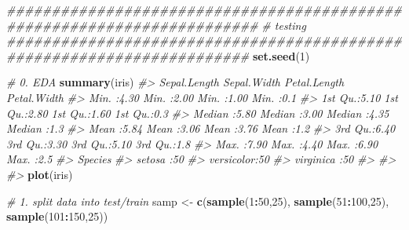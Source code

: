 \documentclass[]{book}
\newenvironment{Shaded}{\begin{snugshade}}{\end{snugshade}}
\newcommand{\CommentTok}[1]{\textcolor[rgb]{0.56,0.35,0.01}{\textit{#1}}}
\newcommand{\DecValTok}[1]{\textcolor[rgb]{0.00,0.00,0.81}{#1}}
\newcommand{\KeywordTok}[1]{\textcolor[rgb]{0.13,0.29,0.53}{\textbf{#1}}}
\newcommand{\NormalTok}[1]{#1}
\newcommand{\OperatorTok}[1]{\textcolor[rgb]{0.81,0.36,0.00}{\textbf{#1}}}
\newcommand{\StringTok}[1]{\textcolor[rgb]{0.31,0.60,0.02}{#1}}
\begin{document}
\begin{Shaded}
\begin{Highlighting}[]

\CommentTok{########################################################################}
\CommentTok{# testing}
\CommentTok{#######################################################################}
\KeywordTok{set.seed}\NormalTok{(}\DecValTok{1}\NormalTok{)}

\CommentTok{# 0. EDA}
\KeywordTok{summary}\NormalTok{(iris)}
\CommentTok{#>   Sepal.Length   Sepal.Width    Petal.Length   Petal.Width }
\CommentTok{#>  Min.   :4.30   Min.   :2.00   Min.   :1.00   Min.   :0.1  }
\CommentTok{#>  1st Qu.:5.10   1st Qu.:2.80   1st Qu.:1.60   1st Qu.:0.3  }
\CommentTok{#>  Median :5.80   Median :3.00   Median :4.35   Median :1.3  }
\CommentTok{#>  Mean   :5.84   Mean   :3.06   Mean   :3.76   Mean   :1.2  }
\CommentTok{#>  3rd Qu.:6.40   3rd Qu.:3.30   3rd Qu.:5.10   3rd Qu.:1.8  }
\CommentTok{#>  Max.   :7.90   Max.   :4.40   Max.   :6.90   Max.   :2.5  }
\CommentTok{#>        Species  }
\CommentTok{#>  setosa    :50  }
\CommentTok{#>  versicolor:50  }
\CommentTok{#>  virginica :50  }
\CommentTok{#>                 }
\CommentTok{#>                 }
\CommentTok{#> }
\KeywordTok{plot}\NormalTok{(iris)}

\CommentTok{# 1. split data into test/train}
\NormalTok{samp <-}\StringTok{ }\KeywordTok{c}\NormalTok{(}\KeywordTok{sample}\NormalTok{(}\DecValTok{1}\OperatorTok{:}\DecValTok{50}\NormalTok{,}\DecValTok{25}\NormalTok{), }\KeywordTok{sample}\NormalTok{(}\DecValTok{51}\OperatorTok{:}\DecValTok{100}\NormalTok{,}\DecValTok{25}\NormalTok{), }\KeywordTok{sample}\NormalTok{(}\DecValTok{101}\OperatorTok{:}\DecValTok{150}\NormalTok{,}\DecValTok{25}\NormalTok{))}


\end{Highlighting}
\end{Shaded}
\end{document}
